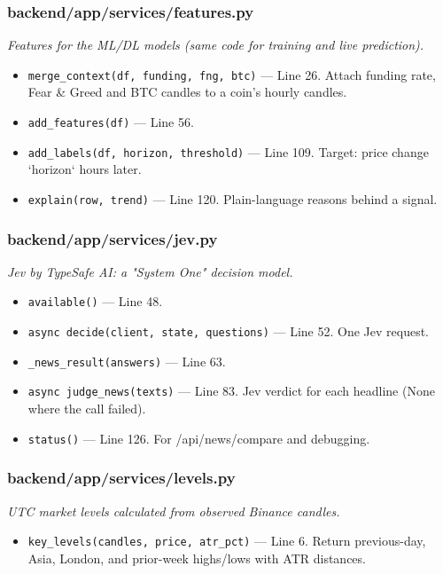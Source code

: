 \subsubsection*{backend/app/services/features.py}
\textit{Features for the ML/DL models (same code for training and live prediction).}
\begin{itemize}[nosep,leftmargin=1.5em]
\item \texttt{merge\_\allowbreak{}context(\allowbreak{}df,\allowbreak{} funding,\allowbreak{} fng,\allowbreak{} btc)} --- Line 26. Attach funding rate, Fear \& Greed and BTC candles to a coin's hourly candles.
\item \texttt{add\_\allowbreak{}features(\allowbreak{}df)} --- Line 56.
\item \texttt{add\_\allowbreak{}labels(\allowbreak{}df,\allowbreak{} horizon,\allowbreak{} threshold)} --- Line 109. Target: price change `horizon` hours later.
\item \texttt{explain(\allowbreak{}row,\allowbreak{} trend)} --- Line 120. Plain-language reasons behind a signal.
\end{itemize}
\subsubsection*{backend/app/services/jev.py}
\textit{Jev by TypeSafe AI: a "System One" decision model.}
\begin{itemize}[nosep,leftmargin=1.5em]
\item \texttt{available(\allowbreak{})} --- Line 48.
\item \texttt{async decide(\allowbreak{}client,\allowbreak{} state,\allowbreak{} questions)} --- Line 52. One Jev request.
\item \texttt{\_\allowbreak{}news\_\allowbreak{}result(\allowbreak{}answers)} --- Line 63.
\item \texttt{async judge\_\allowbreak{}news(\allowbreak{}texts)} --- Line 83. Jev verdict for each headline (None where the call failed).
\item \texttt{status(\allowbreak{})} --- Line 126. For /api/news/compare and debugging.
\end{itemize}
\subsubsection*{backend/app/services/levels.py}
\textit{UTC market levels calculated from observed Binance candles.}
\begin{itemize}[nosep,leftmargin=1.5em]
\item \texttt{key\_\allowbreak{}levels(\allowbreak{}candles,\allowbreak{} price,\allowbreak{} atr\_\allowbreak{}pct)} --- Line 6. Return previous-day, Asia, London, and prior-week highs/lows with ATR distances.
\end{itemize}
